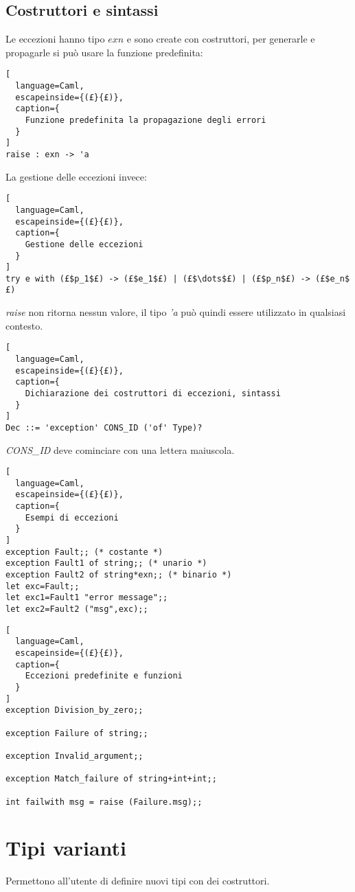\subsection{Costruttori e sintassi}
Le eccezioni hanno tipo $exn$ e sono create con costruttori, per generarle
e propagarle si può usare la funzione predefinita:
\begin{lstlisting}[
  language=Caml,
  escapeinside={(£}{£)},
  caption={
    Funzione predefinita la propagazione degli errori
  }
]
raise : exn -> 'a
\end{lstlisting}

La gestione delle eccezioni invece:
\begin{lstlisting}[
  language=Caml,
  escapeinside={(£}{£)},
  caption={
    Gestione delle eccezioni
  }
]
try e with (£$p_1$£) -> (£$e_1$£) | (£$\dots$£) | (£$p_n$£) -> (£$e_n$£)
\end{lstlisting}

\emph{raise} non ritorna nessun valore, il tipo \emph{'a} può quindi
essere utilizzato in qualsiasi contesto.


\begin{lstlisting}[
  language=Caml,
  escapeinside={(£}{£)},
  caption={
    Dichiarazione dei costruttori di eccezioni, sintassi
  }
]
Dec ::= 'exception' CONS_ID ('of' Type)?
\end{lstlisting}

\emph{CONS\_ID} deve cominciare con una lettera maiuscola.


\begin{lstlisting}[
  language=Caml,
  escapeinside={(£}{£)},
  caption={
    Esempi di eccezioni
  }
]
exception Fault;; (* costante *)
exception Fault1 of string;; (* unario *)
exception Fault2 of string*exn;; (* binario *)
let exc=Fault;;
let exc1=Fault1 "error message";;
let exc2=Fault2 ("msg",exc);;
\end{lstlisting}

\begin{lstlisting}[
  language=Caml,
  escapeinside={(£}{£)},
  caption={
    Eccezioni predefinite e funzioni
  }
]
exception Division_by_zero;;

exception Failure of string;;

exception Invalid_argument;;

exception Match_failure of string+int+int;;

int failwith msg = raise (Failure.msg);;
\end{lstlisting}

\section{Tipi varianti}
Permettono all'utente di definire nuovi tipi con dei costruttori.


